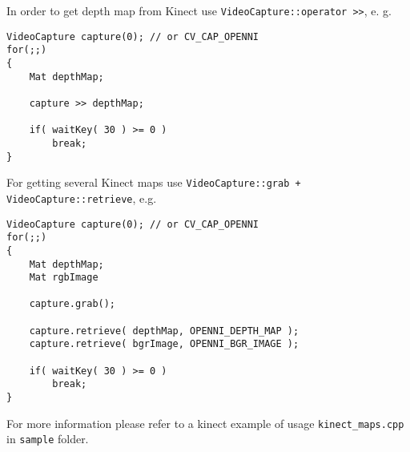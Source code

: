 In order to get depth map from Kinect use \texttt{VideoCapture::operator >>}, e. g.
\begin{lstlisting}
VideoCapture capture(0); // or CV_CAP_OPENNI
for(;;)
{
	Mat depthMap;
	
	capture >> depthMap;
	
	if( waitKey( 30 ) >= 0 )
		break;
}
\end{lstlisting}
For getting several Kinect maps use \texttt{VideoCapture::grab + VideoCapture::retrieve}, e.g.
\begin{lstlisting}
VideoCapture capture(0); // or CV_CAP_OPENNI
for(;;)
{
	Mat depthMap;
	Mat rgbImage
	
	capture.grab();
	
	capture.retrieve( depthMap, OPENNI_DEPTH_MAP );
	capture.retrieve( bgrImage, OPENNI_BGR_IMAGE );
	
	if( waitKey( 30 ) >= 0 )
		break;
}
\end{lstlisting}

For more information please refer to a kinect example of usage \texttt{kinect\_maps.cpp} in \texttt{sample} folder.

\fi
